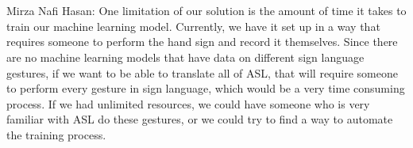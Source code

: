 \documentclass[12pt, titlepage]{article}
\begin{document}
\begin{enumerate}
   ~\\
  \\
    Mirza Nafi Hasan: One limitation of our solution is the amount of time it takes to train our machine learning model. Currently, we have it set up in a way 
that requires someone to perform the hand sign and record it themselves. Since there are no machine learning models that have data on different sign language
gestures, if we want to be able to translate all of ASL, that will require someone to perform every gesture in sign language, which would be a very time 
consuming process. If we had unlimited resources, we could have someone who is very familiar with ASL do these gestures, or we could try to find a way to
automate the training process.
  \\
  ~\\


\end{enumerate}
\end{document}
